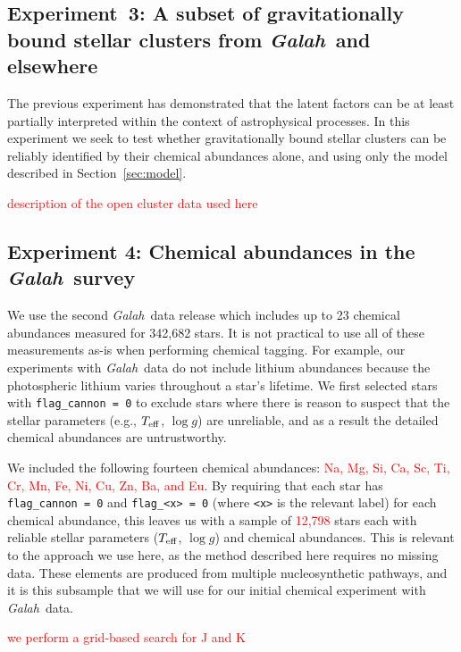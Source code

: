 \documentclass[twocolumn]{aastex61}
\newcommand\teff{T_{\rm eff}}
\newcommand\logg{\log{g}}
\newcommand{\project}[1]{\textsl{#1}}
\newcommand{\Galah}{\project{Galah}}
\newcommand{\todo}[1]{\textcolor{red}{#1}}
\begin{document}
\subsection{Experiment~3: A subset of gravitationally bound stellar clusters 
			from \Galah\ and elsewhere}
\label{sec:exp3}

The previous experiment has demonstrated that the latent factors can be at least
partially interpreted within the context of astrophysical processes. In this
experiment we seek to test whether gravitationally bound stellar clusters can be
reliably identified by their chemical abundances alone, and using only the model 
described in Section~\ref{sec:model}.

\todo{description  of the open cluster data used here}





\subsection{Experiment 4: Chemical abundances in the \Galah\ survey}
\label{sec:exp4}


We use the second \Galah\ data release \citep{Buder:2018a} which
includes up to 23 chemical abundances measured for 342,682
stars. It is not practical to use all of these measurements as-is
when performing chemical tagging. For example, our experiments
with \Galah\ data do not include lithium abundances because the
photospheric lithium varies throughout a star's lifetime. 
We first selected stars with \texttt{flag\_cannon = 0} to exclude
stars where there is reason to suspect that the stellar parameters
(e.g., $\teff$, $\logg$) are unreliable, and as a result the 
detailed chemical abundances are untrustworthy. 

We included the following fourteen chemical abundances: \todo{Na, Mg, 
Si, Ca, Sc, Ti, Cr, Mn, Fe, Ni, Cu, Zn, Ba, and Eu}.
By requiring that each star has \texttt{flag\_cannon = 0} and
\texttt{flag\_<x> = 0} (where \texttt{<x>} is the relevant label)
for each chemical abundance, this leaves
us with a sample of \todo{12,798} stars each with reliable stellar
parameters ($\teff$, $\logg$) and chemical abundances.
This is relevant to the approach we use here, as the method
described here requires no missing data.
These elements are produced from multiple nucleosynthetic
pathways, and it is this subsample that we will use for 
our initial chemical experiment with \Galah\ data.


\todo{we perform a grid-based search for J and K}
\end{document}
